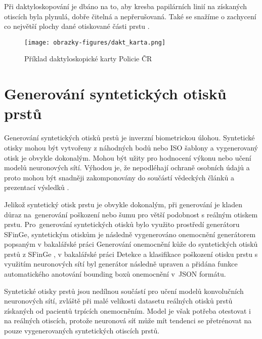 Při daktyloskopování je dbáno na to, aby kresba papilárních linií na získaných otiscích byla plynulá, dobře čitelná a nepřerušovaná. Také se snažíme o zachycení co největší plochy dané otiskované části prstu \cite{BIOdaktylLecture}.

\begin{figure}[!htbp]
    \centering
    \texttt{[image: obrazky-figures/dakt\_karta.png]}
    \caption{Příklad daktyloskopické karty Policie ČR \cite{BIOdaktylLecture}}
\end{figure}

\section{Generování syntetických otisků prstů}
Generování syntetických otisků prstů je inverzní biometrickou úlohou. Syntetické otisky mohou být vytvořeny z náhodných bodů nebo ISO šablony a vygenerovaný otisk je obvykle dokonalým. Mohou být užity pro hodnocení výkonu nebo učení modelů neuronových sítí. Výhodou je, že nepodléhají ochraně osobních údajů a proto mohou být snadněji zakomponovány do součástí vědeckých článků a prezentací výsledků \cite{BIOotiskyLecture}.

Jelikož syntetický otisk prstu je obvykle dokonalým, při generování je kladen důraz na~generování poškození nebo šumu pro větší podobnost s reálným otiskem prstu. Pro~generování syntetických otisků bylo využito prostředí generátoru SFinGe, syntetickým otiskům je následně vygenerováno onemocnění generátorem popsaným v bakalářské práci Generování onemocnění kůže do syntetických otisků prstů z
SFinGe \cite{FITBT21893}, v bakalářské práci Detekce a klasifikace poškození otisku prstu s využitím neuronových sítí \cite{FITBT22567} byl generátor následně upraven a přidána funkce automatického anotování bounding boxů onemocnění v~JSON formátu.

Syntetické otisky prstů jsou nedílnou součástí pro učení modelů konvolučních neuronových sítí, zvláště při malé velikosti datasetu reálných otisků prstů získaných od pacientů trpících onemocněním. Model je však potřeba otestovat i na reálných otiscích, protože neuronová síť může mít tendenci se přetrénovat na pouze vygenerovaných syntetických otiscích prstů.

